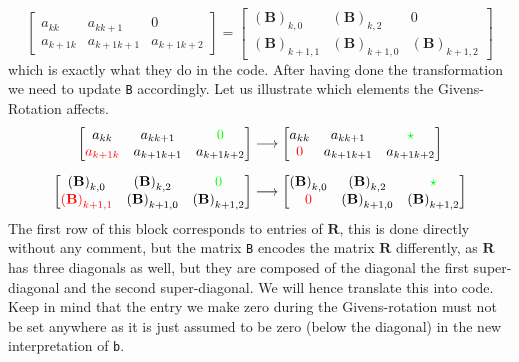 \documentclass{article}
\begin{document}
\begin{equation*}
     \begin{bmatrix}
        a_{kk} & a_{kk+1} & 0 \\
        a_{k+1k} & a_{k+1k+1} & a_{k+1k+2}
    \end{bmatrix} = 
    \begin{bmatrix}
        \left(\mathbf{B}\right)_{k,0} & \left(\mathbf{B}\right)_{k,2} & 0 \\
        \left(\mathbf{B}\right)_{k+1,1} & \left(\mathbf{B}\right)_{k+1,0} & \left(\mathbf{B}\right)_{k+1,2}
    \end{bmatrix}
\end{equation*}
which is exactly what they do in the code. After having done the transformation we need to update \verb|B| accordingly. Let us illustrate which elements the Givens-Rotation affects.
\begin{align*}
     \begin{bmatrix}
        a_{kk} & a_{kk+1} &\color{green} 0\color{black} \\
        \color{red}a_{k+1k}\color{green} & a_{k+1k+1} & a_{k+1k+2}
    \end{bmatrix} &\longrightarrow
    \begin{bmatrix}
        a_{kk} & a_{kk+1} &\color{green} \star\color{black} \\
        \color{red}0\color{green} & a_{k+1k+1} & a_{k+1k+2}
    \end{bmatrix} \\[2mm]
    \begin{bmatrix}
        \left(\mathbf{B}\right)_{k,0} & \left(\mathbf{B}\right)_{k,2} & \color{green}0\color{black} \\
        \color{red}\left(\mathbf{B}\right)_{k+1,1}\color{black} & \left(\mathbf{B}\right)_{k+1,0} & \left(\mathbf{B}\right)_{k+1,2}
    \end{bmatrix}
    &\longrightarrow
    \begin{bmatrix}
        \left(\mathbf{B}\right)_{k,0} & \left(\mathbf{B}\right)_{k,2} & \color{green}\star\color{black} \\
        \color{red}0\color{black} & \left(\mathbf{B}\right)_{k+1,0} & \left(\mathbf{B}\right)_{k+1,2}
    \end{bmatrix}
\end{align*}
The first row of this block corresponds to entries of $\mathbf{R}$, this is done directly without any comment, but the matrix \verb|B| encodes the matrix $\mathbf{R}$ differently, as $\mathbf{R}$ has three diagonals as well, but they are composed of the diagonal the first super-diagonal and the second super-diagonal. We will hence translate this into code. Keep in mind that the entry we make zero during the Givens-rotation must not be set anywhere as it is just assumed to be zero (below the diagonal) in the new interpretation of \verb|b|.
\end{document}
